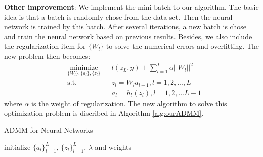 \documentclass[letterpaper, 10 pt, conference]{ieeeconf}  %
\begin{document}
\textbf{Other improvement}: We implement the mini-batch to our algorithm. The basic idea is that a batch is randomly chose from the data set. Then the neural network is trained by this batch. After several iterations, a new batch is chose and train the neural network based on previous results. Besides, we also include the regularization item for $\{W_l\}$ to solve the numerical errors and overfitting. The new problem then becomes:
\begin{equation}
\begin{aligned} 
& \underset{\{W_l\},\{a_l\}, \{z_l\}}{\text{minimize}}
& & l(z_L,y) + \sum_{l=1}^L \alpha ||W_l||^2 \\
& \text{s.t.}
& & z_l = W_la_{l-1},  l = 1,2,...,L \\
& & & a_l = h_l(z_l),  l = 1,2,...L-1 \label{eq:modelWithReg}
\end{aligned}
\end{equation}
where $\alpha$ is the weight of regularization. The new algorithm to solve this optimization problem is discribed in Algorithm \ref{alg:ourADMM}.
\begin{algorithm} 
\caption{ADMM for Neural Networks}
\label{alg:ourADMM}
initialize $\{a_l\}^{L}_{l=1}$, $\{z_l\}^{L}_{l=1}$, $\lambda$ and weights\\

\end{algorithm}
\end{document}
